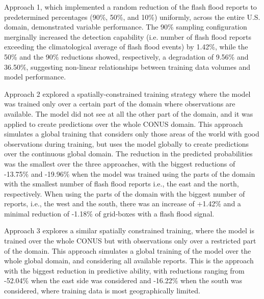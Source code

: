 Approach 1, which implemented a random reduction of the flash flood reports to predetermined percentages (90\%, 50\%, and 10\%) uniformly, across the entire U.S. domain, demonstrated variable performance. The 90\% sampling configuration merginally increased the detection capability (i.e. number of flash flood reports exceeding the climatological average of flash flood events) by 1.42\%, while the 50\% and the 90\% reductions showed, respectively, a degradation of 9.56\% and 36.50\%, suggesting non-linear relationships between training data volumes and model performance.

Approach 2 explored a spatially-constrained training strategy where the model was trained only over a certain part of the domain where observations are available. The model did not see at all the other part of the domain, and it was applied to create predictions over the whole CONUS domain. This approach simulates a global training that considers only those areas of the world with good observations during training, but uses the model globally to create predictions over the continuous global domain. The reduction in the predicted probabilities was the smallest over the three approaches, with the biggest  reductions of -13.75\% and -19.96\% when the model was trained using the parts of the domain with the smallest number of flash flood reports i.e., the east and the north, respectively. When using the parts of the domain with the biggest number of reports, i.e., the west and the south, there was an increase of +1.42\% and a minimal reduction of -1.18\% of grid-boxes with a flash flood signal.

Approach 3 explores a similar spatially constrained training, where the model is trained over the whole CONUS but with observations only over a restricted part of the domain. This approach simulates a global training of the model over the whole global domain, and considering all available reports. This is the approach with the biggest reduction in predictive ability, with reductions ranging from -52.04\% when the east side was considered and -16.22\% when the south was considered, where training data is most geographically limited.

